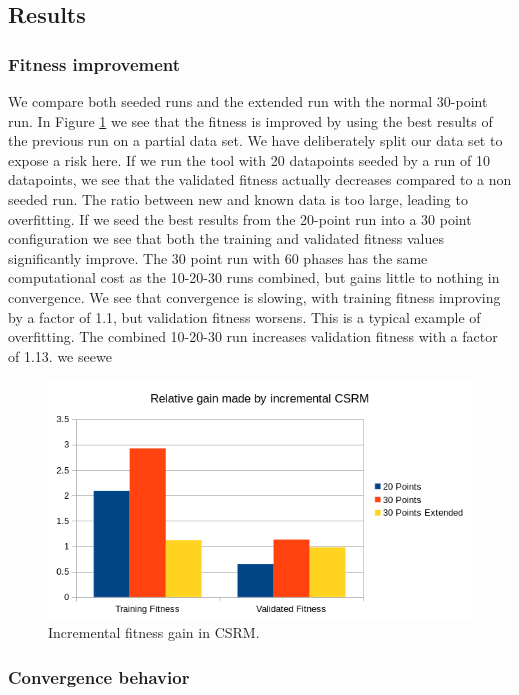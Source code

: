 \subsection{Results}
\subsubsection{Fitness improvement}
We compare both seeded runs and the extended run with the normal 30-point run. In Figure \ref{fig:incrementalgain} we see that the fitness is improved by using the best results of the previous run on a partial data set. We have deliberately split our data set to expose a risk here. If we run the tool with 20 datapoints seeded by a run of 10 datapoints, we see that the validated fitness actually decreases compared to a non seeded run. The ratio between new and known data is too large, leading to overfitting. If we seed the best results from the 20-point run into a 30 point configuration we see that both the training and validated fitness values significantly improve. 
The 30 point run with 60 phases has the same computational cost as the 10-20-30 runs combined, but gains little to nothing in convergence. We see that convergence is slowing, with training fitness improving by a factor of 1.1, but validation fitness worsens. This is a typical example of overfitting. The combined 10-20-30 run increases validation fitness with a factor of 1.13. we seewe
\begin{figure}
    \centering
    \includegraphics[width=\textwidth,height=\textheight,keepaspectratio]{figures/incrementalgain.png}
    \caption{Incremental fitness gain in CSRM.}
    \label{fig:incrementalgain}
\end{figure}
\subsubsection{Convergence behavior}
